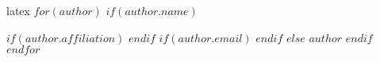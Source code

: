 latex
$for(author)$
    $if(author.name)$
        \author{$author.name$}
        $if(author.affiliation)$
        $endif$
        $if(author.email)$
        $endif$
    $else$
        $author$
    $endif$
$endfor$
